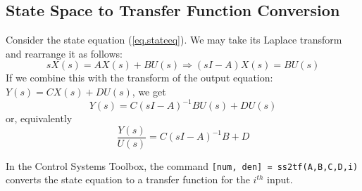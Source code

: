 \subsection{State Space to Transfer Function Conversion}
Consider the state equation (\ref{eq.stateeq}).  We may take its Laplace transform and rearrange it as follows:
\begin{equation*}
    sX(s) = AX(s) + BU(s) \Rightarrow (sI - A)X(s) = BU(s)
\end{equation*}
If we combine this with the transform of the output equation: $Y(s) = CX(s) + DU(s)$, we get
\begin{equation*}
    Y(s) = C(sI - A)^{-1} BU(s) + DU(s)
\end{equation*}
or, equivalently
\begin{equation}
    \frac{Y(s)}{U(s)} = C(sI-A)^{-1} B+D
    \label{eq.TFfromSS}
\end{equation}
\par
In the Control Systems Toolbox, the command \verb#[num, den] = ss2tf(A,B,C,D,i)# converts the state equation to a transfer function for the $i^{th}$ input.

